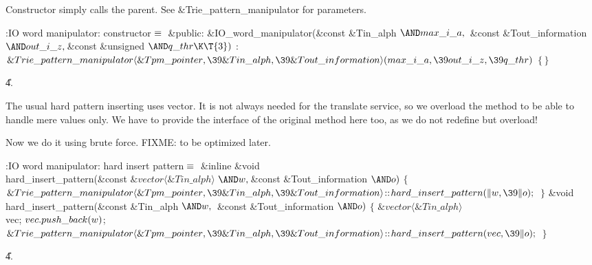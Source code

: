 Constructor simply calls the parent. See \&{Trie\_pattern\_manipulator}
for parameters.

\Y\B\4:IO word manipulator: constructor\X${}\equiv{}$\6
\4\&{public}:\6
\&{IO\_word\_manipulator}(\&{const} \&{Tin\_alph} ${}{\AND}\\{max\_i\_a},\39{}$%
\&{const} \&{Tout\_information} ${}{\AND}\\{out\_i\_z},\39{}$\&{const} %
\&{unsigned} ${}{\AND}\\{q\_thr}\K\T{3}){}$\1\1\2\2\6
: ${}\&{Trie\_pattern\_manipulator}\langle\&{Tpm\_pointer},\39\&{Tin\_alph},\39%
\&{Tout\_information}\rangle(\\{max\_i\_a},\39\\{out\_i\_z},\39\\{q\_thr}){}$
${}\{\,\}{}$\par
\U4.\fi

The usual hard pattern inserting uses vector. It is not always needed
for the translate service, so we overload the method to be able to
handle mere values only. We have to provide the interface of the
original method here too, as we do not redefine but overload!

Now we do it using brute force. FIXME: to be optimized later.

\Y\B\4:IO word manipulator: hard insert pattern\X${}\equiv{}$\6
\&{inline} \&{void} \\{hard\_insert\_pattern}(\&{const} ${}\&{vector}\langle%
\&{Tin\_alph}\rangle{}$ ${}{\AND}\|w,\39{}$\&{const} \&{Tout\_information} ${}{%
\AND}\|o){}$\1\1\2\2\6
${}\{{}$\1\6
${}\&{Trie\_pattern\_manipulator}\langle\&{Tpm\_pointer},\39\&{Tin\_alph},\39%
\&{Tout\_information}\rangle\DC\\{hard\_insert\_pattern}(\|w,\39\|o);{}$\6
\4${}\}{}$\2\7
\&{void} \\{hard\_insert\_pattern}(\&{const} \&{Tin\_alph} ${}{\AND}\|w,\39{}$%
\&{const} \&{Tout\_information} ${}{\AND}\|o){}$\1\1\2\2\6
${}\{{}$\1\6
${}\&{vector}\langle\&{Tin\_alph}\rangle{}$ \\{vec};\7
${}\\{vec}.\\{push\_back}(\|w){}$;\6
${}\&{Trie\_pattern\_manipulator}\langle\&{Tpm\_pointer},\39\&{Tin\_alph},\39%
\&{Tout\_information}\rangle\DC\\{hard\_insert\_pattern}(\\{vec},\39\|o);{}$\6
\4${}\}{}$\2\par
\U4.\fi

